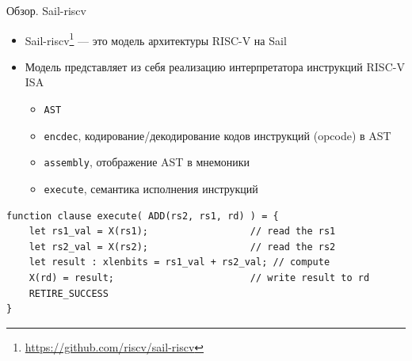 \documentclass
  [ russian
  , aspectratio=169 %
  ] {beamer}
\begin{document}
\begin{frame}[fragile]{Обзор. Sail-riscv}


    \begin{itemize}
        \item Sail-riscv\footnote[frame]{\url{https://github.com/riscv/sail-riscv}} --- это модель архитектуры RISC-V на Sail
        \item Модель представляет из себя реализацию интерпретатора инструкций RISC-V ISA

              \begin{itemize}
                  \item \texttt{AST}
                  \item \texttt{encdec}, кодирование/декодирование кодов инструкций (opcode) в AST
                  \item \texttt{assembly}, отображение AST в мнемоники
                  \item \texttt{execute}, семантика исполнения инструкций
              \end{itemize}

    \end{itemize}


    \begin{lstlisting}[caption={}, language=sail, frame=single]
function clause execute( ADD(rs2, rs1, rd) ) = {
    let rs1_val = X(rs1);                  // read the rs1
    let rs2_val = X(rs2);                  // read the rs2
    let result : xlenbits = rs1_val + rs2_val; // compute
    X(rd) = result;                        // write result to rd
    RETIRE_SUCCESS
}
    \end{lstlisting}

\end{frame}
\end{document}
